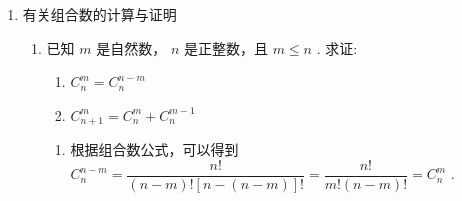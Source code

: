 \begin{enumerate}
\begin{enumerate}
\begin{jieda}
\begin{enumerate}
                \item 
                则 6 人分配到三所学校每所学校至少一人一共有: ${360} + {90} + {90} = {540}$ 种方法.
            \end{enumerate}
        \end{jieda}
    \end{enumerate}
    
    \item 有关组合数的计算与证明
    \begin{enumerate}

        \item 已知 $m$ 是自然数， $n$ 是正整数，且 $m \leq  n$ . 求证: 
        \begin{enumerate}
            \item ${{C}}_{n}^{m} = {{C}}_{n}^{n - m}$
            \item ${{C}}_{n + 1}^{m} = {{C}}_{n}^{m} + {{C}}_{n}^{m - 1}$
        \end{enumerate}
        \begin{jieda}
            \begin{enumerate}
                \item 根据组合数公式，可以得到 ${{C}}_{n}^{n - m} = \dfrac{n!}{\left( {n - m}\right) !\left\lbrack  {n - \left( {n - m}\right) }\right\rbrack  !} = \dfrac{n!}{m!\left( {n - m}\right) !} = {{C}}_{n}^{m}$ .
                

\end{enumerate}
\end{jieda}
\end{enumerate}
\end{enumerate}
